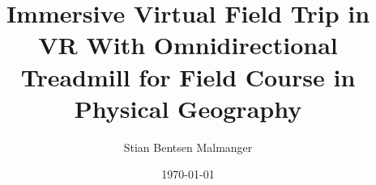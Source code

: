 \documentclass[british,titlepage]{ntnuthesis}
\title{Immersive Virtual Field Trip in VR With Omnidirectional Treadmill for Field Course in Physical Geography}
\author{Stian Bentsen Malmanger}
\date{\today}
\begin{document}




\tableofcontents
\listoffigures
\listoftables
\lstlistoflistings









\printbibliography

%

\appendix
%
\end{document}
